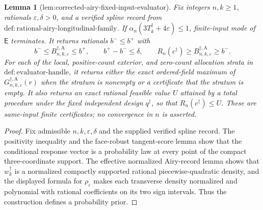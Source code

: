 \documentclass{article}
\newtheorem{lemma}{Lemma}
\begin{document}
{\begin{lemma}[lem:corrected-airy-fixed-input-evaluator]\label{lem:corrected-airy-fixed-input-evaluator}
Fix integers \(n,k\ge1\), rationals \(\varepsilon,\delta>0\), and a verified spline record from
\(\mathrm{def:rational\text{-}airy\text{-}longitudinal\text{-}family}\).  If
\(\alpha_n(3T_k^\dagger+4\varepsilon)\le1\), finite-input mode of \(\mathsf E\) terminates.  It returns rationals \(b^-\le b^+\) with
\[
b^-\le B_{n,k,\varepsilon}^{\dagger,\mathrm A}\le b^+,
\qquad b^+-b^-\le\delta,
\qquad
R_n(c^\dagger)\ge B_{n,k,\varepsilon}^{\dagger,\mathrm A}\ge b^-.
\]
For each of the local, positive-count exterior, and zero-count allocation strata in
\(\mathrm{def:evaluator\text{-}handle}\), it returns either the exact ordered-field maximum of
\(G_{n,k,\varepsilon}^{\dagger,\mathrm A}(r)\) when the stratum is nonempty or a certificate that the stratum is empty.  It also returns an exact rational feasible value \(U\) attained by a total procedure under the fixed independent design
\(q^\dagger\), so that \(R_n(c^\dagger)\le U\).  These are same-input finite certificates; no convergence in \(n\) is asserted.
\end{lemma}
\begin{proof}
Fix admissible \(n,k,\varepsilon,\delta\) and the supplied verified spline record.
The positivity inequality and the face-robust tangent-score lemma show that the
conditional response vector is a probability law at every point of the compact
three-coordinate support.  The effective normalized Airy-record lemma shows that
\(w_k^\dagger\) is a normalized compactly supported rational piecewise-quadratic
density, and the displayed formula for \(\rho_\varepsilon\) makes each transverse
density normalized and polynomial with rational coefficients on its two sign
intervals.  Thus the construction defines a probability prior.


\end{proof}}
\end{document}
